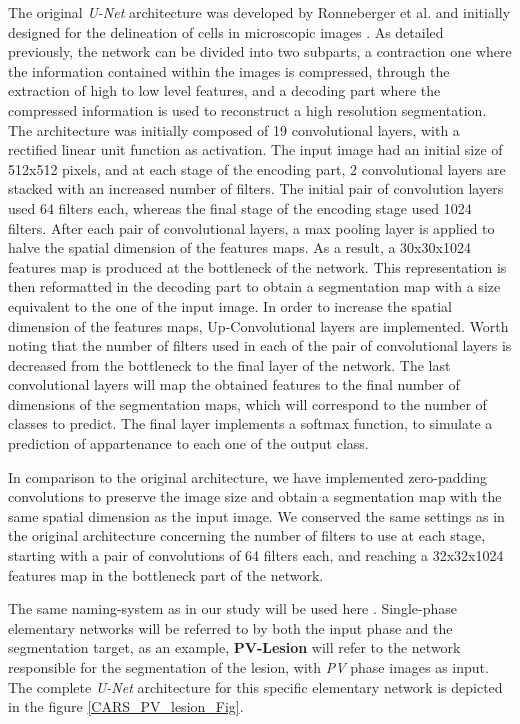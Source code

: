 \documentclass[]{article}
\newcommand{\pplfont}[1]{{\textbf{\fontfamily{ppl}\selectfont #1}}}
\begin{document}
The original \emph{U-Net} architecture was developed by Ronneberger et
al. and initially designed for the
delineation of cells in microscopic images \cite{Ronneberger2015}. As detailed previously, the
network can be divided into two subparts, a contraction one where the
information contained within the images is compressed, through the
extraction of high to low level features, and a decoding part where the
compressed information is used to reconstruct a high resolution
segmentation. The architecture was initially composed of 19
convolutional layers, with a rectified linear unit function as
activation. The input image had an initial size of 512x512 pixels, and
at each stage of the encoding part, 2 convolutional layers are stacked
with an increased number of filters. The initial pair of convolution
layers used 64 filters each, whereas the final stage of the encoding
stage used 1024 filters. After each pair of convolutional layers, a max
pooling layer is applied to halve the spatial dimension of the features
maps. As a result, a 30x30x1024 features map is produced at the
bottleneck of the network. This representation is then reformatted in
the decoding part to obtain a segmentation map with a size equivalent to
the one of the input image. In order to increase the spatial dimension
of the features maps, Up-Convolutional layers are implemented. Worth
noting that the number of filters used in each of the pair of
convolutional layers is decreased from the bottleneck to the final layer
of the network. The last convolutional layers will map the obtained
features to the final number of dimensions of the segmentation maps,
which will correspond to the number of classes to predict. The final
layer implements a softmax function, to simulate a prediction of
appartenance to each one of the output class.

In comparison to the original architecture, we have implemented
zero-padding convolutions to preserve the image size and obtain a
segmentation map with the same spatial dimension as the input image. We
conserved the same settings as in the original architecture concerning
the number of filters to use at each stage, starting with a pair of
convolutions of 64 filters each, and reaching a 32x32x1024 features map
in the bottleneck part of the network.

The same naming-system as in our study will be used
here \cite{Ouhmich2019}. Single-phase elementary networks will be referred to by both the
input phase and the segmentation target, as an example, \pplfont{PV-Lesion} will
refer to the network responsible for the segmentation of the lesion,
with \emph{PV} phase images as input. The complete \emph{U-Net}
architecture for this specific elementary network is depicted in the figure \ref{CARS_PV_lesion_Fig}.
\end{document}

